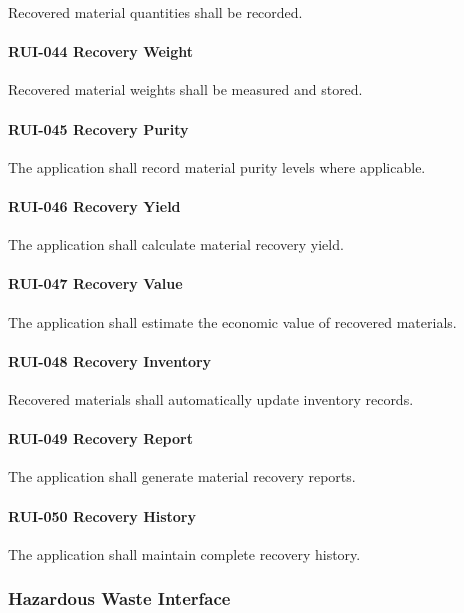 Recovered material quantities shall be recorded.

\paragraph{RUI-044 Recovery Weight}

Recovered material weights shall be measured and stored.

\paragraph{RUI-045 Recovery Purity}

The application shall record material purity levels where applicable.

\paragraph{RUI-046 Recovery Yield}

The application shall calculate material recovery yield.

\paragraph{RUI-047 Recovery Value}

The application shall estimate the economic value of recovered
materials.

\paragraph{RUI-048 Recovery Inventory}

Recovered materials shall automatically update inventory records.

\paragraph{RUI-049 Recovery Report}

The application shall generate material recovery reports.

\paragraph{RUI-050 Recovery History}

The application shall maintain complete recovery history.


\subsubsection*{Hazardous Waste Interface}

